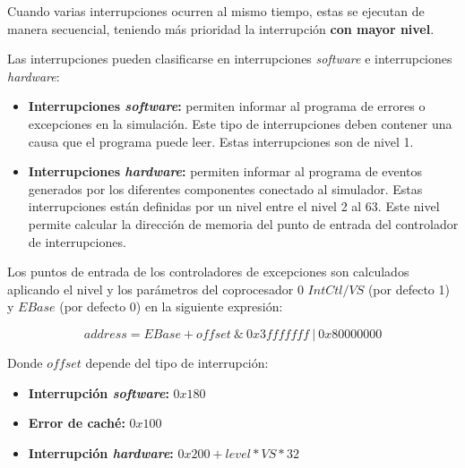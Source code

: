 \noindent Cuando varias interrupciones ocurren al mismo tiempo,
estas se ejecutan de manera secuencial, teniendo más prioridad
la interrupción \textbf{con mayor nivel}.

\noindent Las interrupciones pueden clasificarse en interrupciones
\textit{software} e interrupciones \textit{hardware}:
\begin{itemize}
    \item \textbf{Interrupciones \textit{software}:} permiten informar
    al programa de errores o excepciones en la simulación.
    Este tipo de interrupciones deben contener una causa que
    el programa puede leer.
    Estas interrupciones son de nivel 1.
    \item \textbf{Interrupciones \textit{hardware}:} permiten informar
    al programa de eventos generados por los diferentes componentes
    conectado al simulador.
    Estas interrupciones están definidas por un nivel entre el
    nivel 2 al 63.
    Este nivel permite calcular la dirección de memoria
    del punto de entrada del controlador de interrupciones.
\end{itemize}

\noindent Los puntos de entrada de los controladores de excepciones
son calculados aplicando el nivel y los parámetros del coprocesador
0 $IntCtl/VS$ (por defecto 1) y $EBase$ (por defecto 0) en la
siguiente expresión:

\[address = EBase + offset \ \& \ 0x3fffffff \ | \ 0x80000000\]

\noindent Donde $offset$ depende del tipo de interrupción:
\begin{itemize}
    \item \textbf{Interrupción \textit{software}:} $0x180$
    \item \textbf{Error de caché:} $0x100$
    \item \textbf{Interrupción \textit{hardware}:} $0x200 + level * VS * 32$
\end{itemize}